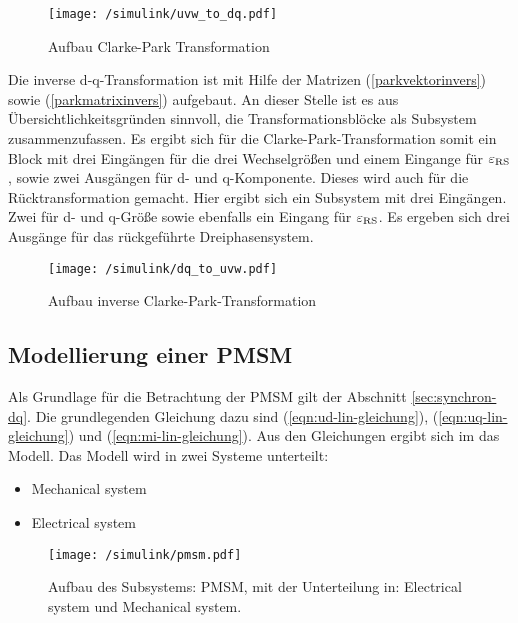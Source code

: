 \begin{figure}[htb!]
	\centering
	\texttt{[image: /simulink/uvw\_to\_dq.pdf]}
	\label{fig:uvw_to_dq}
	\caption{Aufbau Clarke-Park Transformation}
\end{figure}

Die inverse d-q-Transformation ist mit Hilfe der Matrizen (\ref{parkvektorinvers}) sowie (\ref{parkmatrixinvers}) aufgebaut.
An dieser Stelle ist es aus Übersichtlichkeitsgründen sinnvoll, die Transformationsblöcke als Subsystem zusammenzufassen.
Es ergibt sich für die Clarke-Park-Transformation somit ein Block mit drei Eingängen für die drei Wechselgrößen und einem Eingange für $\varepsilon_{\mathrm{RS}}$, sowie zwei Ausgängen für d- und q-Komponente.
Dieses wird auch für die Rücktransformation gemacht. 
Hier ergibt sich ein Subsystem mit drei Eingängen. 
Zwei für d- und q-Größe sowie ebenfalls ein Eingang für $\varepsilon_{\mathrm{RS}}$.
Es ergeben sich drei Ausgänge für das rückgeführte Dreiphasensystem.

\begin{figure}[htb!]
	\centering
	\texttt{[image: /simulink/dq\_to\_uvw.pdf]}
	\label{fig:dq_to_uvw}
	\caption{Aufbau inverse Clarke-Park-Transformation}
\end{figure}


\subsection{Modellierung einer PMSM}

Als Grundlage für die Betrachtung der PMSM gilt der Abschnitt \ref{sec:synchron-dq}.
Die grundlegenden Gleichung dazu sind (\ref{eqn:ud-lin-gleichung}), (\ref{eqn:uq-lin-gleichung}) und (\ref{eqn:mi-lin-gleichung}).
Aus den Gleichungen ergibt sich im  das Modell.
Das Modell wird in zwei Systeme unterteilt:

\begin{itemize}
	\item Mechanical system
	\item Electrical system
\end{itemize}

\begin{figure}[h!]
	\centering
	\texttt{[image: /simulink/pmsm.pdf]}
	\label{fig:pmsm}
	\caption{Aufbau des Subsystems: PMSM, mit der Unterteilung in: Electrical system und Mechanical system.}
\end{figure}

